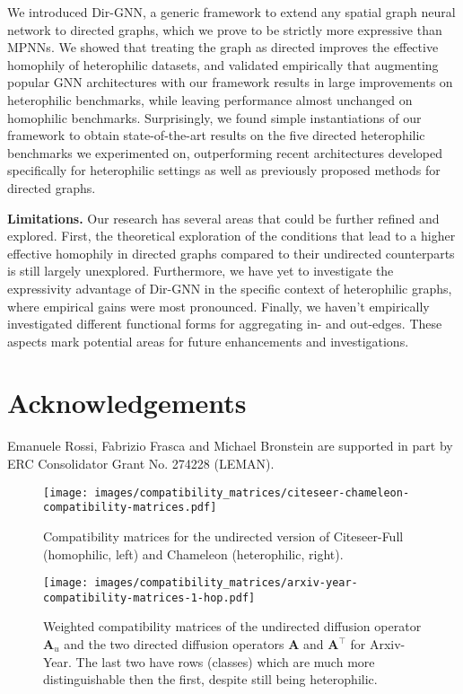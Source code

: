 \documentclass{article}
\newcommand\oursacro{Dir-GNN}
\theoremstyle{plain}
\theoremstyle{definition}
\theoremstyle{remark}
\begin{document}
We introduced \oursacro, a generic framework to extend any spatial graph neural network to directed graphs, which we prove to be strictly more expressive than MPNNs. We showed that treating the graph as directed improves the effective homophily of heterophilic datasets, and validated empirically that augmenting popular GNN architectures with our framework results in large improvements on heterophilic benchmarks, while leaving performance almost unchanged on homophilic benchmarks. Surprisingly, we found simple instantiations of our framework to obtain state-of-the-art results on the five directed heterophilic benchmarks we experimented on, outperforming recent architectures developed specifically for heterophilic settings as well as previously proposed methods for directed graphs.

\textbf{Limitations.} Our research has several areas that could be further refined and explored. First, the theoretical exploration of the conditions that lead to a higher effective homophily in directed graphs compared to their undirected counterparts is still largely unexplored. Furthermore, we have yet to investigate the expressivity advantage of \oursacro{} in the specific context of heterophilic graphs, where empirical gains were most pronounced.  Finally, we haven't empirically investigated different functional forms for aggregating in- and out-edges. These aspects mark potential areas for future enhancements and investigations.  
\section*{Acknowledgements}
Emanuele Rossi, Fabrizio Frasca and Michael Bronstein are supported in part by ERC Consolidator Grant No. 274228 (LEMAN).




\appendix
{}
\newpage



\begin{figure}
    \centering
    \texttt{[image: images/compatibility\_matrices/citeseer-chameleon-compatibility-matrices.pdf]}
    \caption{Compatibility matrices for the undirected version of Citeseer-Full (homophilic, left) and Chameleon (heterophilic, right).}
    \label{fig:citeseer_chameleon_compat}
\end{figure}

\begin{figure*}
    \centering
    \texttt{[image: images/compatibility\_matrices/arxiv-year-compatibility-matrices-1-hop.pdf]}
    \caption{Weighted compatibility matrices of the undirected diffusion operator $\mathbf{A}_u$ and the two directed diffusion operators $\mathbf{A}$ and $\mathbf{A}^\top$ for Arxiv-Year. The last two have rows (classes) which are much more distinguishable then the first, despite still being heterophilic.}
    \label{fig:arxiv-year-compat}
\end{figure*}
\end{document}
